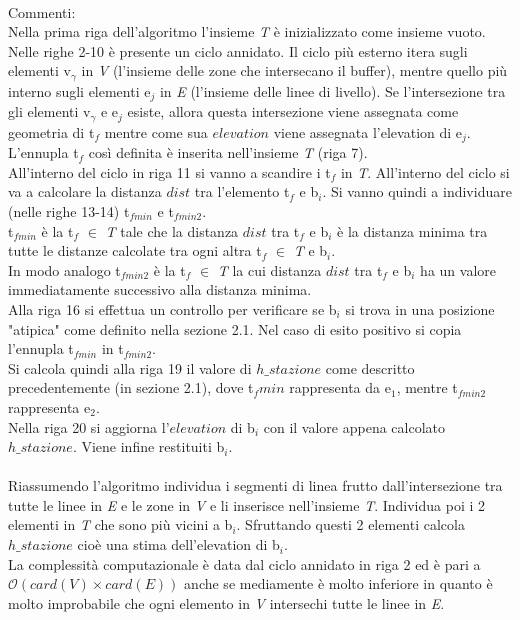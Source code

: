 \mbox{}\\
Commenti:\\
Nella prima riga dell'algoritmo l'insieme \textit{T} è inizializzato come insieme vuoto.\\ 
Nelle righe 2-10 è presente un ciclo annidato. Il ciclo più esterno itera sugli elementi v$_\gamma$ in \textit{V} (l'insieme delle zone che intersecano il buffer), mentre quello più interno sugli elementi e$_j$ in \textit{E} (l'insieme delle linee di livello). Se l'intersezione tra gli elementi v$_\gamma$ e e$_j$ esiste, allora questa intersezione viene assegnata come geometria di t$_f$ mentre come sua $elevation$ viene assegnata l'elevation di e$_j$. L'ennupla t$_f$ così definita è inserita nell'insieme \textit{T} (riga 7). \\
All'interno del ciclo in riga 11 si vanno a scandire i t$_f$ in \textit{T}. All'interno del ciclo si va a calcolare la distanza $dist$ tra l'elemento t$_f$ e b$_i$. Si vanno quindi a individuare (nelle righe 13-14) t$_{fmin}$ e t$_{fmin2}$.\\
t$_{fmin}$ è la t$_f$ $\in$ \textit{T} tale che la distanza $dist$ tra  t$_f$ e b$_i$ è la distanza minima tra tutte le distanze calcolate tra ogni altra t$_f$ $\in$ \textit{T} e b$_i$.\\
In modo analogo t$_{fmin2}$ è la t$_f$ $\in$ \textit{T} la cui distanza $dist$ tra  t$_f$ e b$_i$ ha un valore immediatamente successivo alla distanza minima.\\
Alla riga 16 si effettua un controllo per verificare se b$_i$ si trova in una posizione "atipica" come definito nella sezione 2.1. Nel caso di esito positivo si copia l'ennupla t$_{fmin}$ in t$_{fmin2}$.\\
Si calcola quindi alla riga 19 il valore di $h\_stazione$ come descritto precedentemente (in sezione 2.1), dove t$_fmin$ rappresenta da e$_1$, mentre t$_{fmin2}$ rappresenta e$_2$.\\
Nella riga 20 si aggiorna l'$elevation$ di b$_i$ con il valore appena calcolato $h\_stazione$. Viene infine restituiti b$_i$.\\
\mbox{}\\
Riassumendo l'algoritmo individua i segmenti di linea frutto dall'intersezione tra tutte le linee in \textit{E} e le zone in \textit{V} e li inserisce nell'insieme \textit{T}. Individua poi i 2 elementi in \textit{T} che sono più vicini a b$_i$. Sfruttando questi 2 elementi calcola $h\_stazione$ cioè una stima dell'elevation di b$_i$.\\
La complessità computazionale è data dal ciclo annidato in riga 2 ed è pari a $\mathcal{O}(card(\textit{V}) \times card(\textit{E}))$ anche se mediamente è molto inferiore in quanto è molto improbabile che ogni elemento in \textit{V} intersechi tutte le linee in \textit{E}.\\ 
